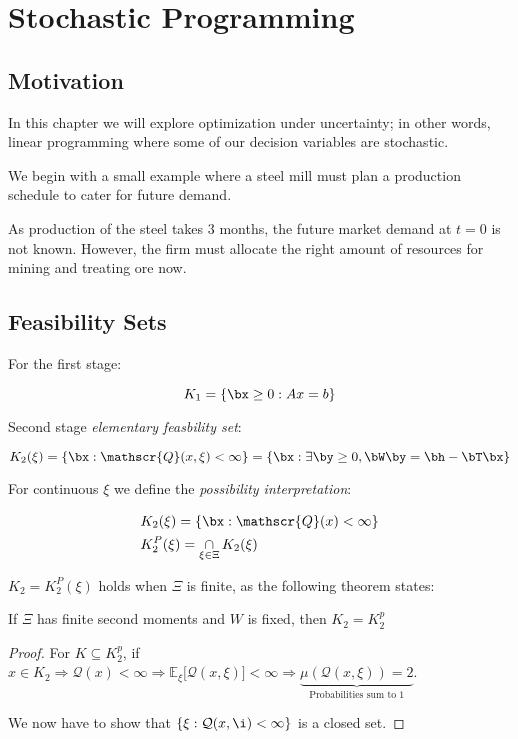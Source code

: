 \section{Stochastic Programming}

\subsection{Motivation}

In this chapter we will explore optimization under uncertainty; in other words,
linear programming where some of our decision variables are stochastic.

We begin with a small example where a steel mill must plan a production schedule
to cater for future demand.

As production of the steel takes 3 months, the future market demand at $t=0$ is 
not known. However, the firm must allocate the right amount of resources for
mining and treating ore now.

\subsection{Feasibility Sets}\label{sec:spforms}

For the first stage:

\[
K_1 = \{ \bx \geq 0 : Ax = b \}
\]

Second stage \emph{elementary feasbility set}:

\[
K_2(\xi) = \{\bx : \mathscr{Q}(x,\xi) < \infty \} =  \{\bx : \exists \by \geq 0, \bW\by  = \bh - \bT\bx \}
\]

For continuous $\xi$ we define the \emph{possibility interpretation}:

\begin{alignat*}{2}
& K_2(\xi) = \{\bx : \mathscr{Q}(x) < \infty \} \\
& K_2^P(\xi) = \mathop{\cap}_{\xi \in \Xi} K_2(\xi) 
\end{alignat*}

$K_2 = K_2^P(\xi)$ holds when $\Xi$ is finite, as the following theorem states:

\begin{thm}\hfill\break
If $\Xi$ has finite second moments and $W$ is fixed, then $K_2 = K_2^p$
\end{thm}

\begin{proof}
For $K\subseteq K_2^p$, if $x \in K_2 \Rightarrow \mathscr{Q}(x) < \infty \Rightarrow 
\mathbb{E}_\xi\big[\mathcal{Q}(x,\xi)\big] < \infty \Rightarrow 
\underbrace{\mu (\mathcal{Q}(x,\xi)) = 2}_{\textrm{Probabilities sum to 1}}$.

We now have to show that $\{ \xi : \mathcal{Q}(x,\i)<\infty\}$ is a closed set.
\end{proof}


